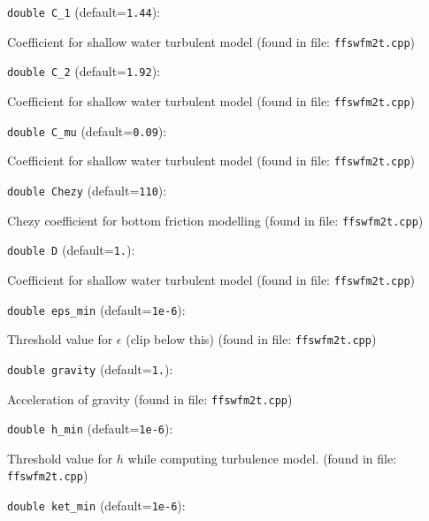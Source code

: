 \item\verb+double C_1+ {\rm(default=\verb|1.44|)}:

Coefficient for shallow water turbulent model
 (found in file: \verb+ffswfm2t.cpp+)
\item\verb+double C_2+ {\rm(default=\verb|1.92|)}:

Coefficient for shallow water turbulent model
 (found in file: \verb+ffswfm2t.cpp+)
\item\verb+double C_mu+ {\rm(default=\verb|0.09|)}:

Coefficient for shallow water turbulent model
 (found in file: \verb+ffswfm2t.cpp+)
\item\verb+double Chezy+ {\rm(default=\verb|110|)}:

Chezy coefficient for bottom friction modelling
 (found in file: \verb+ffswfm2t.cpp+)
\item\verb+double D+ {\rm(default=\verb|1.|)}:

Coefficient for shallow water turbulent model
 (found in file: \verb+ffswfm2t.cpp+)
\item\verb+double eps_min+ {\rm(default=\verb|1e-6|)}:

Threshold value for $\epsilon$ (clip below this)
 (found in file: \verb+ffswfm2t.cpp+)
\item\verb+double gravity+ {\rm(default=\verb|1.|)}:

Acceleration of gravity
 (found in file: \verb+ffswfm2t.cpp+)
\item\verb+double h_min+ {\rm(default=\verb|1e-6|)}:

Threshold value for $h$ while computing turbulence model.
 (found in file: \verb+ffswfm2t.cpp+)
\item\verb+double ket_min+ {\rm(default=\verb|1e-6|)}:

